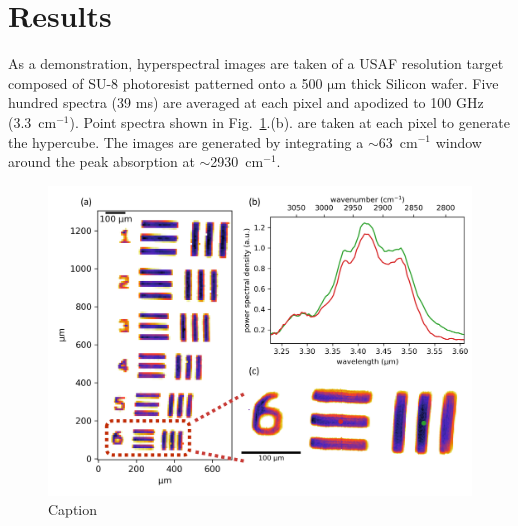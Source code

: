 \documentclass{optica-article}
\begin{document}
\section{Results}

As a demonstration, hyperspectral images are taken of a USAF resolution target composed of SU-8 photoresist patterned onto a 500 $\mathrm{\mu m}$ thick Silicon wafer. Five hundred spectra (39 ms) are averaged at each pixel and apodized to 100 GHz (\mbox{3.3 $\mathrm{cm^{-1}}$}). Point spectra shown in \mbox{Fig. \ref{fig:su8}.(b).} are taken at each pixel to generate the hypercube. The images are generated by integrating a \mbox{$\sim$63 $\mathrm{cm^{-1}}$} window around the peak absorption at \mbox{$\sim$2930 $\mathrm{cm^{-1}}$}. 


\begin{figure}[h]
    \centering
    \includegraphics[width=\linewidth]{su8_image.png}
    \caption{Caption}
    \label{fig:su8}
\end{figure}
\end{document}
